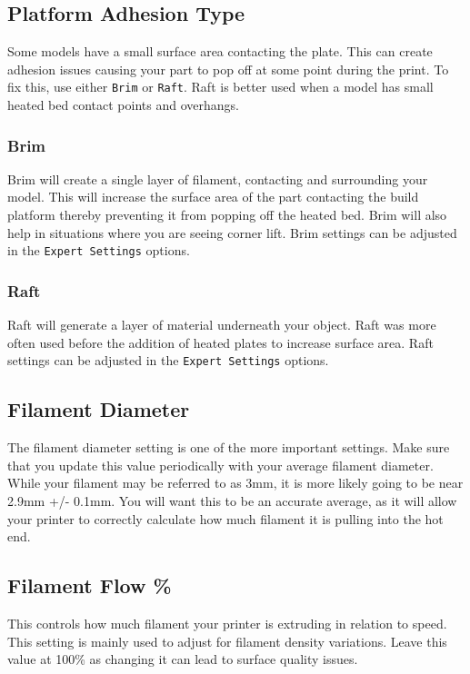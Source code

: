 \subsection{Platform Adhesion Type}
Some models have a small surface area contacting the plate. This can create adhesion issues causing your part to pop off at some point during the print. To fix this, use either \texttt{Brim} or \texttt{Raft}. Raft is better used when a model has small heated bed contact points and overhangs.

\subsubsection{Brim}
Brim will create a single layer of filament, contacting and surrounding your model. This will increase the surface area of the part contacting the build platform thereby preventing it from popping off the heated bed. Brim will also help in situations where you are seeing corner lift. Brim settings can be adjusted in the \texttt{Expert Settings} options.

\subsubsection{Raft}
Raft will generate a layer of material underneath your object. Raft was more often used before the addition of heated plates to increase surface area. Raft settings can be adjusted in the \texttt{Expert Settings} options.

\subsection{Filament Diameter}
The filament diameter setting is one of the more important settings. Make sure that you update this value periodically with your average filament diameter. While your filament may be referred to as 3mm, it is more likely going to be near 2.9mm +/- 0.1mm. You will want this to be an accurate average, as it will allow your printer to correctly calculate how much filament it is pulling into the hot end.

\subsection{Filament Flow \%}
This controls how much filament your printer is extruding in relation to speed. This setting is mainly used to adjust for filament density variations. Leave this value at 100\% as changing it can lead to surface quality issues.


